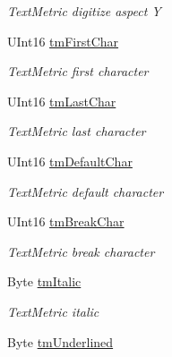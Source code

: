 \begin{DoxyCompactItemize}
\begin{DoxyCompactList}\small\item\em Text\+Metric digitize aspect Y \end{DoxyCompactList}\item 
U\+Int16 \hyperlink{class_pdf_file_writer_1_1_win_text_metric_a3d33f0e070d451b970a8b6a70a2efd73}{tm\+First\+Char}
\begin{DoxyCompactList}\small\item\em Text\+Metric first character \end{DoxyCompactList}\item 
U\+Int16 \hyperlink{class_pdf_file_writer_1_1_win_text_metric_af6acf24a525ef58e9861b94daa75389b}{tm\+Last\+Char}
\begin{DoxyCompactList}\small\item\em Text\+Metric last character \end{DoxyCompactList}\item 
U\+Int16 \hyperlink{class_pdf_file_writer_1_1_win_text_metric_a5365b2a93c5f5c4589cbefa5d0e00bdf}{tm\+Default\+Char}
\begin{DoxyCompactList}\small\item\em Text\+Metric default character \end{DoxyCompactList}\item 
U\+Int16 \hyperlink{class_pdf_file_writer_1_1_win_text_metric_a8dc8f29e6957a7bd84b225861139b46c}{tm\+Break\+Char}
\begin{DoxyCompactList}\small\item\em Text\+Metric break character \end{DoxyCompactList}\item 
Byte \hyperlink{class_pdf_file_writer_1_1_win_text_metric_aee8ee8abafa96f22804ea7287cc40efb}{tm\+Italic}
\begin{DoxyCompactList}\small\item\em Text\+Metric italic \end{DoxyCompactList}\item 
Byte \hyperlink{class_pdf_file_writer_1_1_win_text_metric_a9266ba36e75f53bc68cebee3dd82cda1}{tm\+Underlined}

\end{DoxyCompactItemize}
